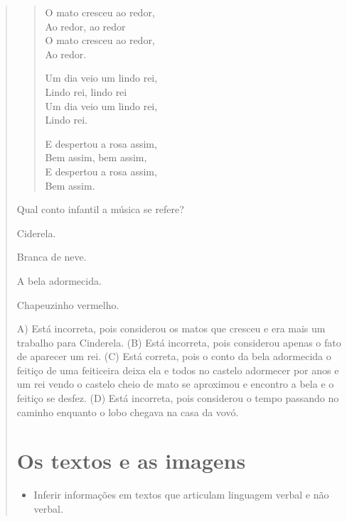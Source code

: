\begin{verse}
\begin{verse}
O mato cresceu ao redor,\\
Ao redor, ao redor\\
O mato cresceu ao redor,\\
Ao redor.

Um dia veio um lindo rei,\\
Lindo rei, lindo rei\\
Um dia veio um lindo rei,\\
Lindo rei.

E despertou a rosa assim,\\
Bem assim, bem assim,\\
E despertou a rosa assim,\\
Bem assim.
\end{verse}


Qual conto infantil a música se refere?

\begin{escolha}
\item Ciderela.

\item Branca de neve.

\item A bela adormecida.

\item Chapeuzinho vermelho.
\end{escolha}


A) Está incorreta, pois considerou os matos que cresceu e era mais um
trabalho para Cinderela.
(B) Está incorreta, pois considerou apenas o fato de aparecer um rei.
(C) Está correta, pois o conto da bela adormecida o feitiço de uma
feiticeira deixa ela e todos no castelo adormecer por anos e um rei
vendo o castelo cheio de mato se aproximou e encontro a bela e o feitiço
se desfez.
(D) Está incorreta, pois considerou o tempo passando no caminho enquanto
o lobo chegava na casa da
vovó.

\chapter{Os textos e as imagens}


\begin{itemize}
\item
Inferir informações em textos que articulam linguagem verbal e não verbal.
\end{itemize}


\end{verse}
